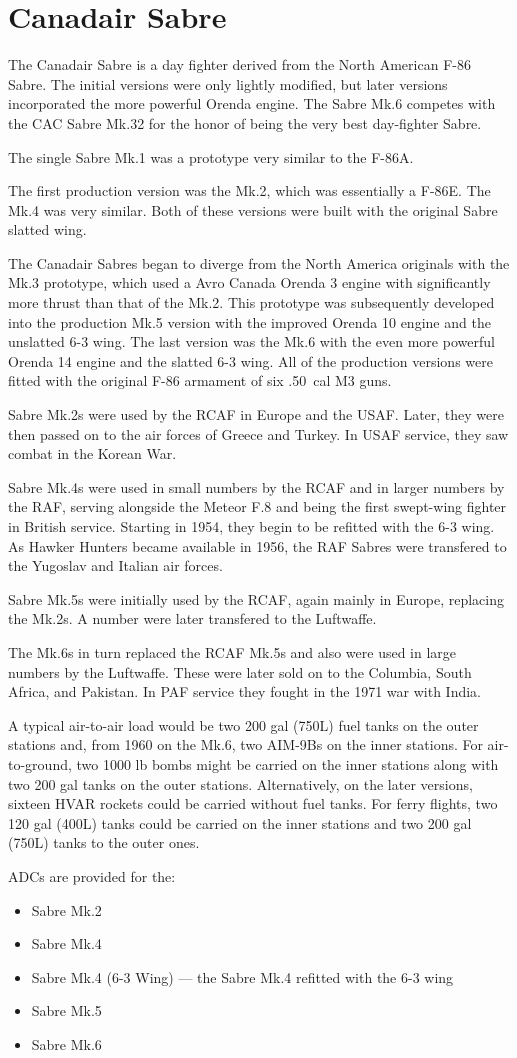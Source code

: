 \section*{Canadair Sabre}

The Canadair Sabre is a day fighter derived from the North American F-86 Sabre. The initial versions were only lightly modified, but later versions incorporated the more powerful Orenda engine. The Sabre Mk.6 competes with the CAC Sabre Mk.32  for the honor of being the very best day-fighter Sabre.

The single Sabre Mk.1 was a prototype very similar to the F-86A. 

The first production version was the Mk.2, which was essentially a F-86E. The Mk.4 was very similar. Both of these versions were built with the original Sabre slatted wing.

The Canadair Sabres began to diverge from the North America originals with the Mk.3 prototype, which used a Avro Canada Orenda 3 engine with significantly more thrust than that of the Mk.2. This prototype was subsequently developed into the production Mk.5 version with the improved Orenda 10 engine and the unslatted 6-3 wing. The last version was the Mk.6 with the even more powerful Orenda 14 engine and the slatted 6-3 wing. All of the production versions were fitted with the original F-86 armament of six .50~cal M3 guns.

Sabre Mk.2s were used by the RCAF in Europe and the USAF. Later, they were then passed on to the air forces of Greece and Turkey. In USAF service, they saw combat in the Korean War.

Sabre Mk.4s were used in small numbers by the RCAF and in larger numbers by the RAF, serving alongside the Meteor F.8 and being the first swept-wing fighter in British service. Starting in 1954, they begin to be refitted with the 6-3 wing. As Hawker Hunters became available in 1956, the RAF Sabres were transfered to the Yugoslav and Italian air forces.

Sabre Mk.5s were initially used by the RCAF, again mainly in Europe, replacing the Mk.2s. A number were later transfered to the Luftwaffe.

The Mk.6s in turn replaced the RCAF Mk.5s and also were used in large numbers by the Luftwaffe. These were later sold on to the Columbia, South Africa, and Pakistan. In PAF service they fought in the 1971 war with India.

A typical air-to-air load would be two 200 gal (750L) fuel tanks on the outer stations and, from 1960 on the Mk.6, two AIM-9Bs on the inner stations. For air-to-ground, two 1000 lb bombs might be carried on the inner stations along with two 200 gal tanks on the outer stations. Alternatively, on the later versions, sixteen HVAR rockets could be carried without fuel tanks. For ferry flights, two 120 gal (400L) tanks could be carried on the inner stations and two 200 gal (750L) tanks to the outer ones.

ADCs are provided for the:
\begin{itemize}
\item Sabre Mk.2
\item Sabre Mk.4
\item Sabre Mk.4 (6-3 Wing) --- the Sabre Mk.4 refitted with the 6-3 wing
\item Sabre Mk.5
\item Sabre Mk.6
\end{itemize}
